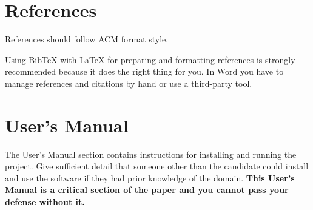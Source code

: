 \documentclass[acmlarge,screen]{acmart}
\begin{document}
\section{References}
References should follow ACM format style.

Using BibTeX with LaTeX for preparing and formatting references 
is strongly recommended because it does the right thing for you.
In Word you have to manage references and citations by hand or use 
a third-party tool.




\appendix

\section{User's Manual}
The User’s Manual section contains instructions for installing and running the project. Give sufficient detail that someone other than the candidate could install and use the software if they had prior knowledge of the domain.  \textbf{This User's Manual is a critical section of the paper and you cannot pass your defense without it.}
\end{document}
